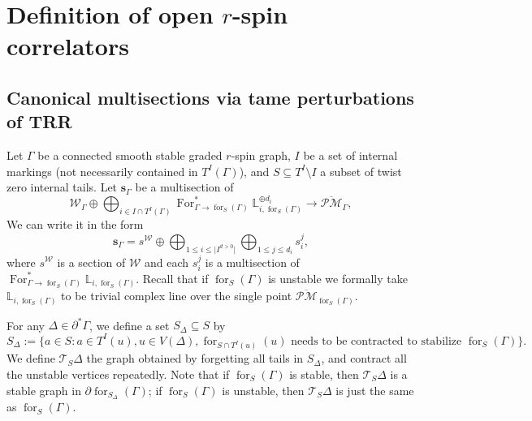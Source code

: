 \documentclass[11pt]{amsart}
\theoremstyle{definition}
\theoremstyle{remark}
\newcommand{\oPMb}{{\overline{\mathcal{PM}}}}
\newcommand{\<}{\left<}
\renewcommand{\>}{\right>}
\numberwithin{equation}{section}
\begin{document}
\section{Definition of open $r$-spin correlators}\label{sec sections def etc}


    \subsection{Canonical multisections via tame perturbations of TRR}\label{sec def of tame and canonical}
    Let $\Gamma$ be a connected smooth stable graded $r$-spin graph, $I$ be a set of internal markings (not necessarily contained in $T^I(\Gamma)$), and $S\subseteq T^I\setminus I$ a subset of twist zero internal tails.
    Let $\bm{s}_\Gamma$ be a multisection %
of 
    $$\mathcal W_{\Gamma}\oplus \bigoplus_{i\in I\cap T^I(\Gamma)} \operatorname{For}^*_{\Gamma \to \operatorname{for}_{S}(\Gamma)}{{\mathbb L}}_{i,\operatorname{for}_{S}(\Gamma)}^{\oplus d_i}\to \oPMb_\Gamma,$$ 
    We can %
write it in the form 
    $$\bm{s}_{\Gamma}=s^{\mathcal W}\oplus\bigoplus_{1\le i \le \lvert I^{d>0}\rvert}\bigoplus_{1\le j \le d_{i}} s^{j}_{i},$$
    where  $s^{\mathcal W}$ is a section of $\mathcal W$ and each $s^{j}_{i}$ is a multisection of $\operatorname{For}^*_{\Gamma \to \operatorname{for}_{S}(\Gamma)}{{\mathbb L}}_{i,\operatorname{for}_{S}(\Gamma)}$. Recall that if $\operatorname{for}_{S}(\Gamma)$ is unstable we formally take ${\mathbb L}_{i,\operatorname{for}_{S}(\Gamma)}$ to be trivial complex line over the single point $\oPMb_{\operatorname{for}_{S}(\Gamma)}$.

    For any $\Delta \in \partial^* \Gamma$, we define a set $S_\Delta \subseteq S$ %
by 
    $$
    S_{\Delta}:=\{a\in S\colon a\in T^I(u), u\in V(\Delta), \operatorname{for}_{S\cap T^I(u)}(u)\text{ needs to be contracted to stabilize }\operatorname{for}_{S}(\Gamma)\}.
    $$
    We %
define $\mathcal T_S \Delta$ the graph obtained by forgetting all tails in $S_{\Delta}$, and contract all the unstable vertices repeatedly. Note that if $\operatorname{for}_{S}(\Gamma)$ is stable, then $\mathcal T_S \Delta$ is a stable graph in $\partial \operatorname{for}_{S_\Delta}(\Gamma)$; if $\operatorname{for}_{S}(\Gamma)$ is unstable, then $\mathcal T_S \Delta$ is just the same as $\operatorname{for}_{S}(\Gamma)$. 
    
\end{document}
